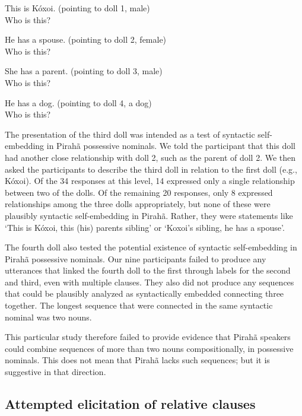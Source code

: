 \documentclass{article}
\begin{document}
\begin{myexample}
\label{kohoi_ex}
\begin{examples}
\item \label{kohoi_ex1} This is Kóxoi. (pointing to doll 1, male)\\
Who is this?
\item \label{kohoi_ex2} He has a spouse. (pointing to doll 2, female)\\
Who is this?
\item \label{kohoi_ex3} She has a parent. (pointing to doll 3, male)\\
Who is this?
\item \label{kohoi_ex4} He has a dog. (pointing to doll 4, a dog)\\
Who is this?
\end{examples}
\end{myexample}

The presentation of the third doll was intended as a test of syntactic self-embedding in Pirahã possessive nominals.  We told the participant that this doll had another close relationship with doll 2, such as the parent of doll 2.  We then asked the participants to describe the third doll in relation to the first doll (e.g., Kóxoi).  Of the 34 responses at this level, 14 expressed only a single relationship between two of the dolls.  Of the remaining 20 responses, only 8 expressed relationships among the three dolls appropriately, but none of these were plausibly syntactic self-embedding in Pirahã.  Rather, they were statements like ‘This is Kóxoi, this (his) parents sibling’ or ‘Koxoi’s sibling, he has a spouse’.

The fourth doll also tested the potential existence of syntactic self-embedding in Pirahã possessive nominals. Our nine participants failed to produce any utterances that linked the fourth doll to the first through labels for the second and third, even with multiple clauses.  They also did not produce any sequences that could be plausibly analyzed as syntactically embedded connecting three together. The longest sequence that were connected in the same syntactic nominal was two nouns.

This particular study therefore failed to provide evidence that Pirahã speakers could combine sequences of more than two nouns compositionally, in possessive nominals.  This does not mean that Pirahã lacks such sequences; but it is suggestive in that direction.

\subsection{Attempted elicitation of relative clauses}
\end{document}
